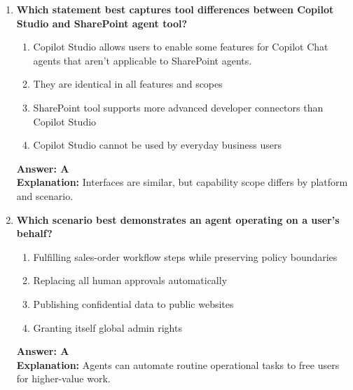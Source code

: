 \documentclass[10pt]{article}
\begin{document}
\begin{enumerate}[leftmargin=*]
This agent allowed Copilot to access the three SharePoint sites and aggregate the information needed to create a more effective sales pitch for the Mega-300 camera, especially in relation to the company's older Mega-200 product

\textbf{What is the main lesson from the Contoso camera case study?}
\begin{enumerate}[label=\Alph*.]
  \item Broadening governed data sources can improve response quality for complex scenarios
  \item Ready-made agents always outperform custom agents
  \item Comparing products should avoid R\&D evidence
  \item Agents should query only one isolated library forever
\end{enumerate}
\textbf{Answer: A}\\
\textbf{Explanation:} Expanding scoped, authorized sources enabled a richer and more differentiated sales pitch.

\item \textbf{Which statement best captures tool differences between Copilot Studio and SharePoint agent tool?}
\begin{enumerate}[label=\Alph*.]
  \item Copilot Studio allows users to enable some features for Copilot Chat agents that aren’t applicable to SharePoint agents. 
  \item They are identical in all features and scopes
  \item SharePoint tool supports more advanced developer connectors than Copilot Studio
  \item Copilot Studio cannot be used by everyday business users
\end{enumerate}
\textbf{Answer: A}\\
\textbf{Explanation:} Interfaces are similar, but capability scope differs by platform and scenario.

\item \textbf{Which scenario best demonstrates an agent operating on a user’s behalf?}
\begin{enumerate}[label=\Alph*.]
  \item Fulfilling sales-order workflow steps while preserving policy boundaries
  \item Replacing all human approvals automatically
  \item Publishing confidential data to public websites
  \item Granting itself global admin rights
\end{enumerate}
\textbf{Answer: A}\\
\textbf{Explanation:} Agents can automate routine operational tasks to free users for higher-value work.


\end{enumerate}
\end{document}
